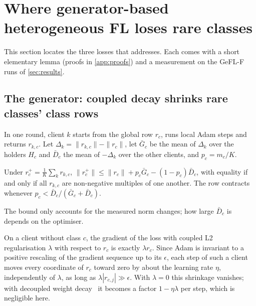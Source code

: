 \section{Where generator-based heterogeneous FL loses rare classes}\label{sec:analysis}

This section locates the three losses that \ours addresses. Each comes with a short elementary lemma (proofs in
\cref{app:proofs}) and a measurement on the GeFL-F runs of \cref{sec:results}.

\subsection{The generator: coupled decay shrinks rare classes' class rows}\label{sec:analysis-gen}

In one round, client $k$ starts from the global row $r_c$, runs local Adam steps and returns $r_{k,c}$. Let
$\Delta_k=\|r_{k,c}\|-\|r_c\|$, let $\bar G_c$ be the mean of $\Delta_k$ over the holders $H_c$ and $\bar D_c$ the mean
of $-\Delta_k$ over the other clients, and $p_c=m_c/K$.

\begin{lemma}\label{prop:contraction}
Under $r_c^+=\frac1K\sum_k r_{k,c}$, $\|r_c^+\|\le\|r_c\|+p_c\bar G_c-(1-p_c)\bar D_c$, with equality if and only if
all $r_{k,c}$ are non-negative multiples of one another. The row contracts whenever $p_c<\bar D_c/(\bar G_c+\bar D_c)$.
\end{lemma}

The bound only accounts for the measured norm changes; how large $\bar D_c$ is depends on the optimiser.

\begin{lemma}\label{lem:adam}
On a client without class $c$, the gradient of the loss with coupled L2 regularisation $\lambda$ with respect to $r_c$
is exactly $\lambda r_c$. Since Adam is invariant to a positive rescaling of the gradient sequence up to its
$\epsilon$, each step of such a client moves every coordinate of $r_c$ toward zero by about the learning rate $\eta$,
independently of $\lambda$, as long as $\lambda|r_{c,j}|\gg\epsilon$. With $\lambda=0$ this shrinkage vanishes; with decoupled weight
decay~\cite{loshchilov2019adamw} it becomes a factor $1-\eta\lambda$ per step, which is negligible here.
\end{lemma}

